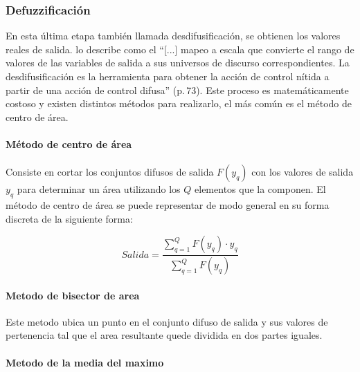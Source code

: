         \subsubsection{Defuzzificación}

            En esta última etapa también llamada desdifusificación, se obtienen los valores reales de salida. \textcite{cruz2010inteligencia} lo describe como el \enquote{[...] mapeo a escala que convierte el rango de valores de las variables de salida a sus universos de discurso correspondientes. La desdifusificación es la herramienta para obtener la acción de control nítida a partir de una acción de control difusa} (p.$\,$73). Este proceso es matemáticamente costoso y existen distintos métodos para realizarlo, el más común es el método de centro de área.
            
            \paragraph{Método de centro de área}

                Consiste en cortar los conjuntos difusos de salida $F(y_q)$ con los valores de salida $y_q$ para determinar un área utilizando los $Q$ elementos que la componen. El método de centro de área se puede representar de modo general en su forma discreta de la siguiente forma:

                \pagebreak
                
                \begin{equation}\label{eq:Centroide}
                    Salida = \frac{\displaystyle\sum\limits_{q=1}^{Q}F(y_q)\cdot y_q}{\displaystyle\sum\limits_{q=1}^{Q}F(y_q)}
                \end{equation}

            \paragraph{Metodo de bisector de area}
                
                Este metodo ubica un punto en el conjunto difuso de salida y sus valores de pertenencia tal que el area resultante quede dividida en dos partes iguales.

            \paragraph{Metodo de la media del maximo}
                
